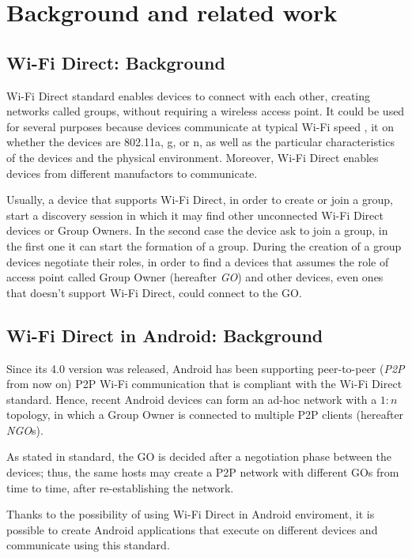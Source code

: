 \section{Background and related work} %
\subsection{Wi-Fi Direct: Background}
Wi-Fi Direct standard enables devices to connect with each other, creating 
networks called groups, without requiring a wireless access point. It could be 
used for several purposes because devices communicate at typical Wi-Fi speed 
\cite{bib:wifiP2pspec}, it on whether the devices are 802.11a, g, or n, as well
as the particular characteristics of the devices and the physical environment.
Moreover, Wi-Fi Direct enables devices from different manufactors to communicate.

Usually, a device that supports Wi-Fi Direct, in order to create or join a group,
start a discovery session in which it may find other unconnected Wi-Fi Direct 
devices or Group Owners. In the second case the device ask to join a group, in the 
first one it can start the formation of a group. During the creation of a group 
devices negotiate their roles, in order to find a devices that assumes the role of 
access point called Group Owner (hereafter \textit{GO}) and other devices, even 
ones that doesn't support Wi-Fi Direct, could connect to the GO. 

\subsection{Wi-Fi Direct in Android: Background}
Since its 4.0 version was released, Android has been supporting peer-to-peer 
(\textit{P2P} from now on) P2P Wi-Fi communication that is compliant with the 
Wi-Fi Direct standard\cite{bib:wifiP2pspec}. 
Hence, recent Android devices can form an ad-hoc network with a $1:n$ topology,
in which a Group Owner is connected to multiple P2P clients (hereafter \textit{NGO}s).

As stated in standard, the GO is decided after a negotiation phase between the
devices; thus, the same hosts may create a P2P network with different GOs from
time to time, after re-establishing the network.

Thanks to the possibility of using Wi-Fi Direct in Android enviroment, it is 
possible to create Android applications that execute on different devices and 
communicate using this standard. 

